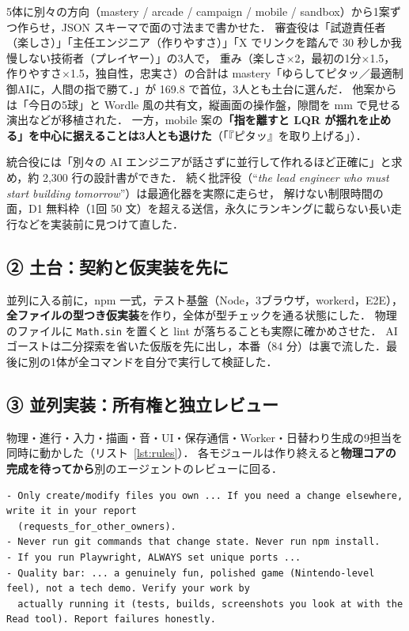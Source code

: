 \documentclass[a4paper,twocolumn,10pt]{ltjsarticle}
\newcommand{\lstref}[1]{リスト~\ref{#1}}
\newcommand{\code}[1]{\texttt{#1}}
\begin{document}
5体に別々の方向（mastery / arcade / campaign / mobile / sandbox）から1案ずつ作らせ，JSON スキーマで面の寸法まで書かせた．
審査役は「試遊責任者（楽しさ）」「主任エンジニア（作りやすさ）」「X でリンクを踏んで 30 秒しか我慢しない技術者（プレイヤー）」の3人で，
重み（楽しさ×2，最初の1分×1.5，作りやすさ×1.5，独自性，忠実さ）の合計は
mastery「ゆらしてピタッ／最適制御AIに，人間の指で勝て．」が 169.8 で首位，3人とも土台に選んだ．
他案からは「今日の5球」と Wordle 風の共有文，縦画面の操作盤，隙間を mm で見せる演出などが移植された．
一方，mobile 案の\textbf{「指を離すと LQR が揺れを止める」を中心に据えることは3人とも退けた}（「『ピタッ』を取り上げる」）．

統合役には「別々の AI エンジニアが話さずに並行して作れるほど正確に」と求め，約 2,300 行の設計書ができた．
続く批評役（``\textit{the lead engineer who must start building tomorrow}''）は最適化器を実際に走らせ，
解けない制限時間の面，D1 無料枠（1回 50 文）を超える送信，永久にランキングに載らない長い走行などを実装前に見つけて直した．

\subsection{② 土台：契約と仮実装を先に}
並列に入る前に，npm 一式，テスト基盤（Node，3ブラウザ，workerd，E2E），\textbf{全ファイルの型つき仮実装}を作り，全体が型チェックを通る状態にした．
物理のファイルに \code{Math.sin} を置くと lint が落ちることも実際に確かめさせた．
AI ゴーストは二分探索を省いた仮版を先に出し，本番（84 分）は裏で流した．最後に別の1体が全コマンドを自分で実行して検証した．

\subsection{③ 並列実装：所有権と独立レビュー}
物理・進行・入力・描画・音・UI・保存通信・Worker・日替わり生成の9担当を同時に動かした（\lstref{lst:rules}）．
各モジュールは作り終えると\textbf{物理コアの完成を待ってから}別のエージェントのレビューに回る．

\begin{lstlisting}[caption={並列実装の共通規則（抜粋）},label={lst:rules}]
- Only create/modify files you own ... If you need a change elsewhere, write it in your report
  (requests_for_other_owners).
- Never run git commands that change state. Never run npm install.
- If you run Playwright, ALWAYS set unique ports ...
- Quality bar: ... a genuinely fun, polished game (Nintendo-level feel), not a tech demo. Verify your work by
  actually running it (tests, builds, screenshots you look at with the Read tool). Report failures honestly.
\end{lstlisting}
\end{document}
